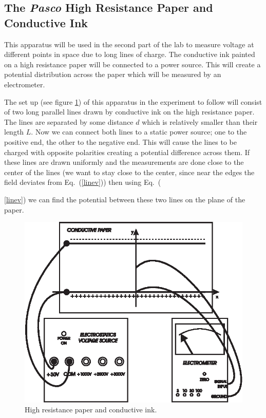 {{\subsection{The {\it Pasco} High Resistance Paper and Conductive Ink}
This apparatus will be used in the second part of the lab to
measure voltage at different points in space due to long lines of
charge.  The conductive ink painted on a high resistance paper
will be connected to a power source.  This will create a potential
distribution across the paper which will be measured by an
electrometer.

The set up (see figure \ref{es4}) of this apparatus in the
experiment to follow will consist of two long parallel lines
drawn by conductive ink on the high resistance paper.  The lines
are separated by some distance $d$ which is relatively smaller
than their length $L$. Now we can connect both lines to a static
power source; one to the positive end, the other to the negative
end. This will cause the lines to be charged with opposite
polarities creating a potential difference across them. If these
lines are drawn uniformly and the measurements are done close to
the center of the lines (we want to stay close to the center, since
near the edges the field deviates from Eq.~(\ref{linev})) then
using Eq.~({\ref{linev}) we can find the potential between these
two lines on the plane of the paper.

\begin{figure}[!htb]
\centering
\epsfxsize=12cm \includegraphics[scale=0.7]{1_electrostatics/es4.eps} 
\caption{High resistance paper and conductive ink.} \label{es4}
\end{figure}

}}}
